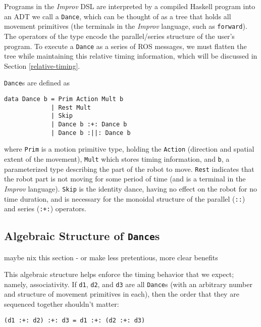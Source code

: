 \documentclass[sigconf]{acmart}
\begin{document}
Programs in the \emph{Improv} DSL are interpreted by a compiled Haskell
program into an ADT we call a \texttt{Dance}, which can be thought of as
a tree that holds all movement primitives (the terminals in the
\emph{Improv} language, such as \texttt{forward}). The operators of the
type encode the parallel/series structure of the user's program. To
execute a \texttt{Dance} as a series of ROS messages, we must flatten
the tree while maintaining this relative timing information, which will
be discussed in Section \ref{relative-timing}.

\texttt{Dance}s are defined as

\begin{verbatim}
data Dance b = Prim Action Mult b
             | Rest Mult
             | Skip
             | Dance b :+: Dance b
             | Dance b :||: Dance b
\end{verbatim}

where \texttt{Prim} is a motion primitive type, holding the
\texttt{Action} (direction and spatial extent of the movement),
\texttt{Mult} which stores timing information, and \texttt{b}, a parameterized type describing the
part of the robot to move. \texttt{Rest} indicates that the robot part
is not moving for some period of time (and is a terminal in the
\emph{Improv} language). \texttt{Skip} is the identity dance, having no
effect on the robot for no time duration, and is necessary for the
monoidal structure of the parallel (\texttt{:\textbar{}\textbar{}:}) and
series (\texttt{:+:}) operators.

\subsection{\texorpdfstring{Algebraic Structure of
\texttt{Dance}s}{Algebraic Structure of Dances}}\label{algebraic-structure-of-dances}

{\color{red} maybe nix this section - or make less pretentious, more clear
benefits}

This algebraic structure helps enforce the timing behavior that we
expect; namely, associativity. If \texttt{d1}, \texttt{d2}, and
\texttt{d3} are all \texttt{Dance}s (with an arbitrary number and
structure of movement primitives in each), then the order that they are
sequenced together shouldn't matter:

\begin{verbatim}
(d1 :+: d2) :+: d3 = d1 :+: (d2 :+: d3)
\end{verbatim}
\end{document}
